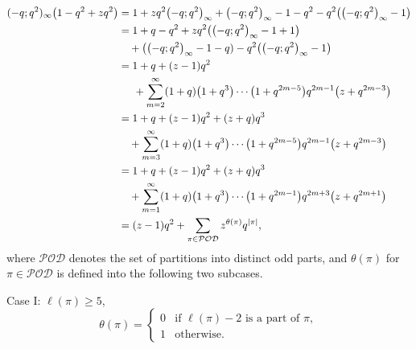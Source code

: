 \documentclass[10pt,a4paper]{amsart}
\numberwithin{equation}{section}
\begin{document}
\begin{align*}
(-q;q^2)_{\infty}\bigl(1-q^2+zq^2\bigr)&=1+zq^2\bigl(-q;q^2\bigr)_{\infty}+\bigl(-q;q^2\bigr)_{\infty}-1-q^2-q^2\bigl(\bigl(-q;q^2\bigr)_{\infty}-1\bigr)
\\
&=1+q-q^2+zq^2\bigl(\bigl(-q;q^2\bigr)_{\infty}-1+1\bigr)
\\
&\quad+\bigl(\bigl(-q;q^2\bigr)_{\infty}-1-q)-q^2\bigl(\bigl(-q;q^2\bigr)_{\infty}-1\bigr)
\\
&=1+q+(z-1)q^2
\\
&\hspace{5mm}+\sum\limits_{m=2}^{\infty}(1+q)\bigl(1+q^3\bigr)\cdots\bigl(1+q^{2m-5}\bigr)q^{2m-1}\bigl(z+q^{2m-3}\bigr)
\\
&=1+q+(z-1)q^2+(z+q)q^3
\\
&\quad+\sum\limits_{m=3}^{\infty}(1+q)\bigl(1+q^3\bigr)\cdots\bigl(1+q^{2m-5}\bigr)q^{2m-1}\bigl(z+q^{2m-3}\bigr)
\\
&=1+q+(z-1)q^2+(z+q)q^3
\\
&\quad+\sum\limits_{m=1}^{\infty}(1+q)\bigl(1+q^3\bigr)\cdots\bigl(1+q^{2m-1}\bigr)q^{2m+3}\bigl(z+q^{2m+1}\bigr)
\\
&=(z-1)q^2+\sum\limits_{\pi \in \mathcal{POD}}z^{\theta(\pi)}q^{|\pi|},
\end{align*}
where $\mathcal{POD}$ denotes the set of partitions into distinct odd parts, and $\theta(\pi)$ for $\pi \in \mathcal{POD}$  is defined into the following two subcases.

Case I: $\ell(\pi) \geq 5$,
\begin{equation*}%
\theta(\pi)=\begin{cases}
0 & \mbox{if $\ell(\pi)-2$ is a part of $\pi$}, \\
1 & \mbox{otherwise.}
\end{cases}
\end{equation*}%
\end{document}
